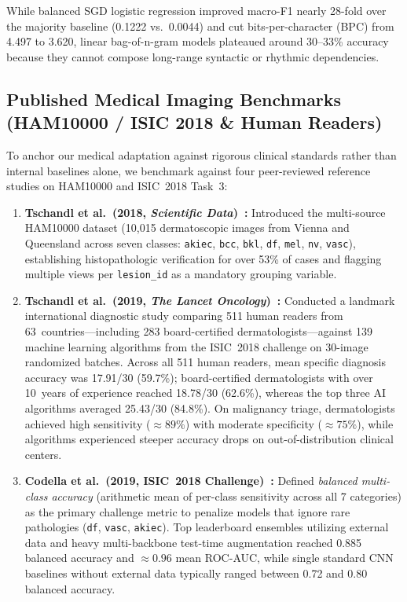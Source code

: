 While balanced SGD logistic regression improved macro-F1 nearly 28-fold over the majority baseline (0.1222 vs.\ 0.0044) and cut bits-per-character (BPC) from 4.497 to 3.620, linear bag-of-n-gram models plateaued around 30--33\% accuracy because they cannot compose long-range syntactic or rhythmic dependencies.

\subsection{Published Medical Imaging Benchmarks (HAM10000 / ISIC 2018 \& Human Readers)}
To anchor our medical adaptation against rigorous clinical standards rather than internal baselines alone, we benchmark against four peer-reviewed reference studies on HAM10000 and ISIC~2018 Task~3:

\begin{enumerate}
  \item \textbf{Tschandl et al.\ (2018, \emph{Scientific Data})~\cite{Tschandl2018dataset}:} Introduced the multi-source HAM10000 dataset (10,015 dermatoscopic images from Vienna and Queensland across seven classes: \texttt{akiec}, \texttt{bcc}, \texttt{bkl}, \texttt{df}, \texttt{mel}, \texttt{nv}, \texttt{vasc}), establishing histopathologic verification for over 53\% of cases and flagging multiple views per \texttt{lesion\_id} as a mandatory grouping variable.
  \item \textbf{Tschandl et al.\ (2019, \emph{The Lancet Oncology})~\cite{Tschandl2019comparison}:} Conducted a landmark international diagnostic study comparing 511 human readers from 63~countries—including 283 board-certified dermatologists—against 139 machine learning algorithms from the ISIC~2018 challenge on 30-image randomized batches. Across all 511 human readers, mean specific diagnosis accuracy was 17.91/30 (59.7\%); board-certified dermatologists with over 10~years of experience reached 18.78/30 (62.6\%), whereas the top three AI algorithms averaged 25.43/30 (84.8\%). On malignancy triage, dermatologists achieved high sensitivity ($\approx 89\%$) with moderate specificity ($\approx 75\%$), while algorithms experienced steeper accuracy drops on out-of-distribution clinical centers.
  \item \textbf{Codella et al.\ (2019, ISIC~2018 Challenge)~\cite{Codella2019skin}:} Defined \emph{balanced multi-class accuracy} (arithmetic mean of per-class sensitivity across all 7 categories) as the primary challenge metric to penalize models that ignore rare pathologies (\texttt{df}, \texttt{vasc}, \texttt{akiec}). Top leaderboard ensembles utilizing external data and heavy multi-backbone test-time augmentation reached 0.885 balanced accuracy and $\approx 0.96$ mean ROC-AUC, while single standard CNN baselines without external data typically ranged between 0.72 and 0.80 balanced accuracy.

\end{enumerate}
